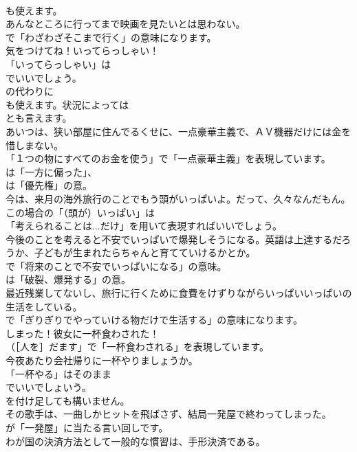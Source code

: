 \documentclass[8pt]{extreport}
\begin{document}
\begin{CJK}{UTF8}{min}
\\	も使えます。	
\\	あんなところに行ってまで映画を見たいとは思わない。 
\\	で「わざわざそこまで行く」の意味になります。	
\\	気をつけてね！いってらっしゃい！ 
\\	「いってらっしゃい」は 
\\	でいいでしょう。
\\	の代わりに 
\\	も使えます。状況によっては 
\\	とも言えます。	
\\	あいつは、狭い部屋に住んでるくせに、一点豪華主義で、ＡＶ機器だけには金を惜しまない。 
\\	「１つの物にすべてのお金を使う」で「一点豪華主義」を表現しています。
\\	は「一方に偏った」、
\\	は「優先権」の意。	
\\	今は、来月の海外旅行のことでもう頭がいっぱいよ。だって、久々なんだもん。 
\\	この場合の「（頭が）いっぱい」は
\\	「考えられることは...だけ」を用いて表現すればいいでしょう。	
\\	今後のことを考えると不安でいっぱいで爆発しそうになる。英語は上達するだろうか、子どもが生まれたらちゃんと育てていけるかとか。 
\\	で「将来のことで不安でいっぱいになる」の意味。
\\	は「破裂、爆発する」の意。	
\\	最近残業してないし、旅行に行くために食費をけずりながらいっぱいいっぱいの生活をしている。 
\\	で「ぎりぎりでやっていける物だけで生活する」の意味になります。	
\\	しまった！彼女に一杯食わされた！ 
\\	（［人を］だます」で「一杯食わされる」を表現しています。	
\\	今夜あたり会社帰りに一杯やりましょうか。 
\\	「一杯やる」はそのまま 
\\	でいいでしょいう。
\\	を付け足しても構いません。	
\\	その歌手は、一曲しかヒットを飛ばさず、結局一発屋で終わってしまった。 
\\	が「一発屋」に当たる言い回しです。	
\\	わが国の決済方法として一般的な慣習は、手形決済である。 

\end{CJK}
\end{document}
